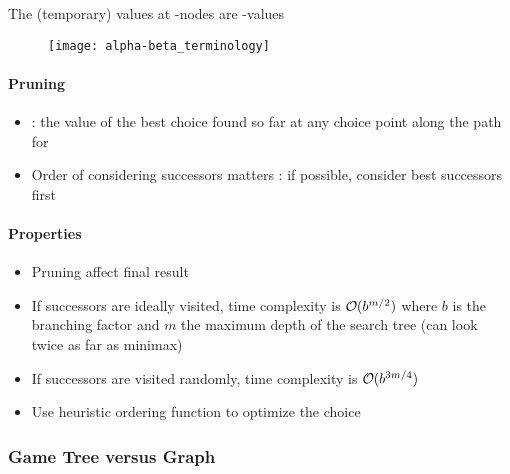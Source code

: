 \begin{minipage}{0.6\textwidth}
	The (temporary) values at -nodes are -values
\end{minipage}
\begin{minipage}{0.4\textwidth}
	\begin{figure}[H]
		\centering
		\texttt{[image: alpha-beta\_terminology]}
	\end{figure}
\end{minipage}

\paragraph{Pruning}

\begin{itemize}
\item \stackanchor[8pt]{\textblue{$\alpha$}}{\textred{$\beta$}} : the value of the best  choice found so far at any choice point along the path for 
\item Order of considering successors matters : if possible, consider best successors first
\end{itemize}

\paragraph{Properties}

\begin{itemize}
\item Pruning  affect final result
\item If successors are ideally visited, time complexity is $\bigO (b^{m/2})$ where $b$ is the branching factor and $m$ the maximum depth of the search tree (can look twice as far as minimax)
\item If successors are visited randomly, time complexity is $\bigO (b^{3m/4})$
\item Use heuristic ordering function to optimize the choice
\end{itemize}

\subsubsection{Game Tree versus Graph}

